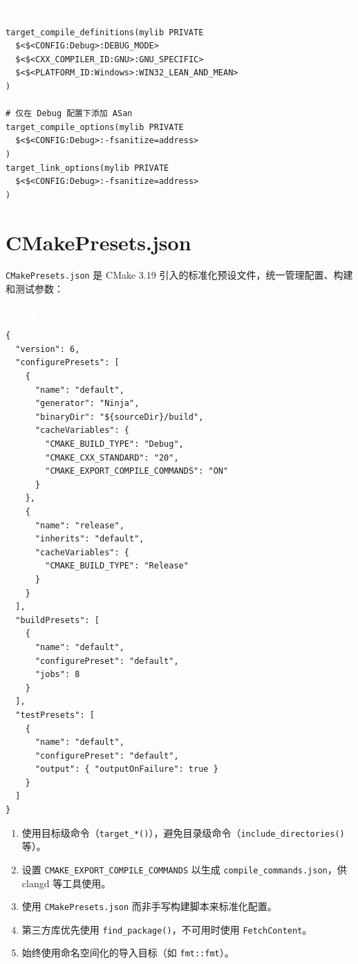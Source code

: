 \documentclass[12pt,a4paper,fontset=fandol]{ctexbook}
\newcommand{\Fn}[1]{\texttt{#1()}}
\newcommand{\Tp}[1]{\texttt{#1}}
\newcommand{\cmakelabel}{%
  \noindent\begin{tcolorbox}[sharp corners,colback=cmakeheadbg,colframe=cmakeheadbg,
    left=6pt,right=6pt,top=2pt,bottom=2pt,boxrule=0pt]
  \textcolor{white}{\small\bfseries\sffamily CMake}\end{tcolorbox}%
}
\newcommand{\cfglabel}{%
  \noindent\begin{tcolorbox}[sharp corners,colback=cfgheadbg,colframe=cfgheadbg,
    left=6pt,right=6pt,top=2pt,bottom=2pt,boxrule=0pt]
  \textcolor{white}{\small\bfseries\sffamily Config}\end{tcolorbox}%
}
\begin{document}
\cmakelabel
\begin{lstlisting}[style=cmakestyle]
target_compile_definitions(mylib PRIVATE
  $<$<CONFIG:Debug>:DEBUG_MODE>
  $<$<CXX_COMPILER_ID:GNU>:GNU_SPECIFIC>
  $<$<PLATFORM_ID:Windows>:WIN32_LEAN_AND_MEAN>
)

# 仅在 Debug 配置下添加 ASan
target_compile_options(mylib PRIVATE
  $<$<CONFIG:Debug>:-fsanitize=address>
)
target_link_options(mylib PRIVATE
  $<$<CONFIG:Debug>:-fsanitize=address>
)
\end{lstlisting}

\section{CMakePresets.json}

\Tp{CMakePresets.json} 是 CMake 3.19 引入的标准化预设文件，统一管理配置、构建和测试参数：

\cfglabel
\begin{lstlisting}[style=bashstyle]
{
  "version": 6,
  "configurePresets": [
    {
      "name": "default",
      "generator": "Ninja",
      "binaryDir": "${sourceDir}/build",
      "cacheVariables": {
        "CMAKE_BUILD_TYPE": "Debug",
        "CMAKE_CXX_STANDARD": "20",
        "CMAKE_EXPORT_COMPILE_COMMANDS": "ON"
      }
    },
    {
      "name": "release",
      "inherits": "default",
      "cacheVariables": {
        "CMAKE_BUILD_TYPE": "Release"
      }
    }
  ],
  "buildPresets": [
    {
      "name": "default",
      "configurePreset": "default",
      "jobs": 8
    }
  ],
  "testPresets": [
    {
      "name": "default",
      "configurePreset": "default",
      "output": { "outputOnFailure": true }
    }
  ]
}
\end{lstlisting}

\begin{bestpractice}[title=CMake 项目最佳实践]
\begin{enumerate}
  \item 使用目标级命令（\Fn{target\_*}），避免目录级命令（\Fn{include\_directories} 等）。
  \item 设置 \Tp{CMAKE\_EXPORT\_COMPILE\_COMMANDS} 以生成 \Tp{compile\_commands.json}，供 clangd 等工具使用。
  \item 使用 \Tp{CMakePresets.json} 而非手写构建脚本来标准化配置。
  \item 第三方库优先使用 \Fn{find\_package}，不可用时使用 \Tp{FetchContent}。
  \item 始终使用命名空间化的导入目标（如 \Tp{fmt::fmt}）。
\end{enumerate}
\end{bestpractice}
\end{document}
